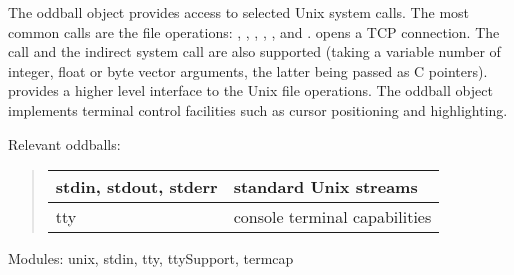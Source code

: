 \documentclass[letterpaper,10pt,english]{sphinxmanual}
\begin{document}
The oddball object  provides access to selected Unix system calls. The most common calls
are the file operations: , , , , ,  and .
 opens a TCP connection. The  call
and the indirect system call are also supported (taking a variable number of integer, float or byte
vector arguments, the latter being passed as C pointers).  provides a higher level interface
to the Unix file operations. The oddball object  implements terminal control facilities such
as cursor positioning and highlighting.

Relevant oddballs:
\begin{quote}

\noindent\begin{tabulary}{\linewidth}{|L|L|}
\hline

stdin, stdout, stderr
&
standard Unix streams
\\
\hline
tty
&
console terminal capabilities
\\
\hline\end{tabulary}

\end{quote}

Modules: unix, stdin, tty, ttySupport, termcap
\end{document}
